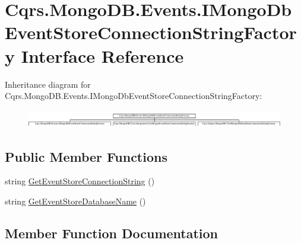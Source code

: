 \hypertarget{interfaceCqrs_1_1MongoDB_1_1Events_1_1IMongoDbEventStoreConnectionStringFactory}{}\section{Cqrs.\+Mongo\+D\+B.\+Events.\+I\+Mongo\+Db\+Event\+Store\+Connection\+String\+Factory Interface Reference}
\label{interfaceCqrs_1_1MongoDB_1_1Events_1_1IMongoDbEventStoreConnectionStringFactory}
Inheritance diagram for Cqrs.\+Mongo\+D\+B.\+Events.\+I\+Mongo\+Db\+Event\+Store\+Connection\+String\+Factory\+:\begin{figure}[H]
\begin{center}
\leavevmode
\includegraphics[height=0.792640cm]{interfaceCqrs_1_1MongoDB_1_1Events_1_1IMongoDbEventStoreConnectionStringFactory}
\end{center}
\end{figure}
\subsection*{Public Member Functions}
\begin{DoxyCompactItemize}
\item 
string \hyperlink{interfaceCqrs_1_1MongoDB_1_1Events_1_1IMongoDbEventStoreConnectionStringFactory_a3860ea4bf6793b081f03fb7cc1dcbb27_a3860ea4bf6793b081f03fb7cc1dcbb27}{Get\+Event\+Store\+Connection\+String} ()
\item 
string \hyperlink{interfaceCqrs_1_1MongoDB_1_1Events_1_1IMongoDbEventStoreConnectionStringFactory_a81ee28bfbb0e567b95f2b280bc6fb298_a81ee28bfbb0e567b95f2b280bc6fb298}{Get\+Event\+Store\+Database\+Name} ()
\end{DoxyCompactItemize}


\subsection{Member Function Documentation}
\mbox{\label{interfaceCqrs_1_1MongoDB_1_1Events_1_1IMongoDbEventStoreConnectionStringFactory_a3860ea4bf6793b081f03fb7cc1dcbb27_a3860ea4bf6793b081f03fb7cc1dcbb27}} 
